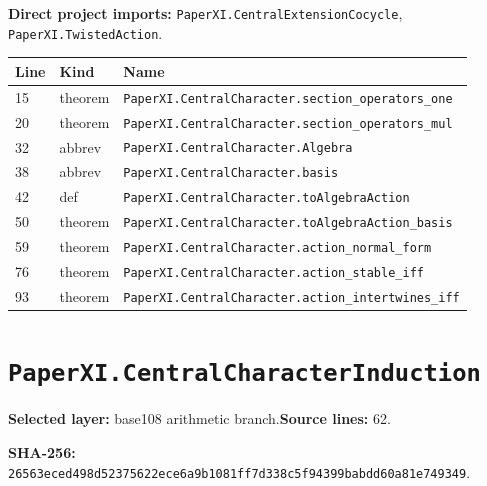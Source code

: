 \documentclass[10pt,oneside]{book}
\begin{document}

\textbf{Direct project imports:} \nolinkurl{PaperXI.CentralExtensionCocycle}, \nolinkurl{PaperXI.TwistedAction}.

\begin{longtable}{@{}p{}p{}p{}@{}}\toprule Line&Kind&Name\\\midrule\endhead

15&theorem&\nolinkurl{PaperXI.CentralCharacter.section_operators_one}\\

20&theorem&\nolinkurl{PaperXI.CentralCharacter.section_operators_mul}\\

32&abbrev&\nolinkurl{PaperXI.CentralCharacter.Algebra}\\

38&abbrev&\nolinkurl{PaperXI.CentralCharacter.basis}\\

42&def&\nolinkurl{PaperXI.CentralCharacter.toAlgebraAction}\\

50&theorem&\nolinkurl{PaperXI.CentralCharacter.toAlgebraAction_basis}\\

59&theorem&\nolinkurl{PaperXI.CentralCharacter.action_normal_form}\\

76&theorem&\nolinkurl{PaperXI.CentralCharacter.action_stable_iff}\\

93&theorem&\nolinkurl{PaperXI.CentralCharacter.action_intertwines_iff}\\

\bottomrule\end{longtable}

\section{\texorpdfstring{\nolinkurl{PaperXI.CentralCharacterInduction}}{PaperXI.CentralCharacterInduction}}\label{module:PaperXI.CentralCharacterInduction}

\textbf{Selected layer:} base108 arithmetic branch.\quad\textbf{Source lines:} 62.\par\textbf{SHA-256:} {\scriptsize\nolinkurl{26563eced498d52375622ece6a9b1081ff7d338c5f94399babdd60a81e749349}}.
\end{document}
